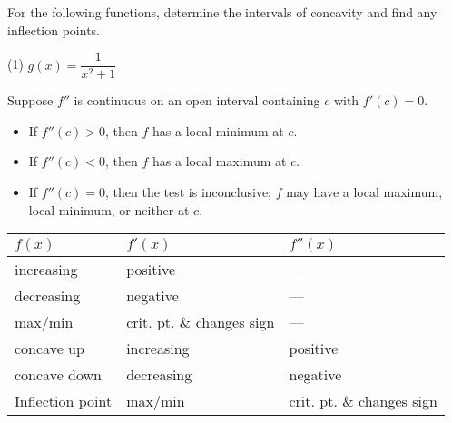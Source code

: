 \documentclass[../mathNotesPreamble]{subfiles}
\begin{document}
  \begin{ex*}
    For the following functions, determine the intervals of concavity and find any inflection points.
  \end{ex*}
  \pagebreak

  \begin{extasks}[after-item-skip=\stretch{1}](1)
    \task $g(x)=\dfrac{1}{x^2+1}$
  \end{extasks}
  \pagebreak

  \begin{thmBox*}
    Suppose $f''$ is continuous on an open interval containing $c$ with $f'(c)=0$.
    \begin{itemize}
      \item If $f''(c)>0$, then $f$ has a local minimum at $c$.
      \item If $f''(c)<0$, then $f$ has a local maximum at $c$.
      \item If $f''(c)=0$, then the test is inconclusive; $f$ may have a local maximum, local minimum, or neither at $c$.
    \end{itemize}
  \end{thmBox*}

  \begin{center}
    \begin{tabularx}{0.95\linewidth}{*{3}{X}}\toprule
      $f(x)$& $f'(x)$& $f''(x)$\\\midrule
      increasing& positive& ---\\
      decreasing& negative& ---\\
      max/min& crit. pt. \& changes sign& ---\\
      concave up& increasing& positive\\
      concave down& decreasing& negative\\
      Inflection point& max/min& crit. pt. \& changes sign\\\bottomrule
    \end{tabularx}
  \end{center}
  \vspace*{-\baselineskip}
  \pagebreak
\end{document}
